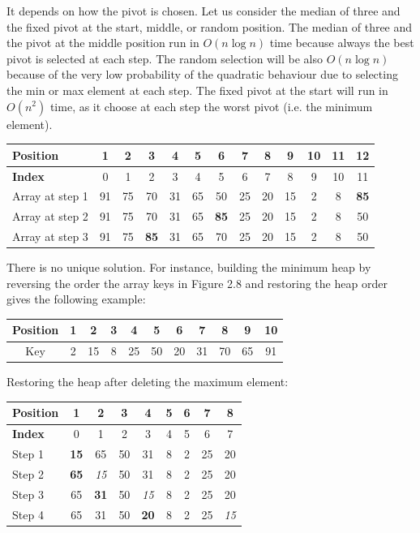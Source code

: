 It depends on how the pivot is chosen. Let us consider 
the median of three and the fixed pivot at the start, middle, or random
position. The median of three and the pivot at the middle position
run in \(O(n\log{n})\) time because always the best pivot is selected
at each step. The random selection will be also \(O(n\log n)\) because
of the very low probability of the quadratic behaviour due to selecting
the min or max element at each step. 
The fixed pivot at the start will run in \(O(n^2)\) time, as it choose 
at each step the 
worst pivot (i.e. the minimum element). 
\fi

\begin{center}
\begin{tabular}{|l|c|c|c|c|c|c|c|c|c|c|c|c|}
\hline
\textbf{Position}& 1& 2& 3& 4& 5& 6& 7& 8& 9& 10& 11& 12 \\
\hline
\textbf{Index}& 0& 1& 2& 3& 4& 5& 6& 7& 8& 9& 10& 11 \\
\hline
Array at step 1& 91& 75& 70& 31& 65& 50& 25& 20& 15& 2& 8& \textbf{85} \\
\hline
Array at step 2& 91& 75& 70& 31& 65& \textbf{85}& 25& 20& 15& 2& 8& 50 \\
\hline
Array at step 3& 91& 75& \textbf{85}& 31& 65& 70& 25& 20& 15& 2& 8& 50 \\
\hline
\end{tabular}
\end{center}

There is no unique solution. For instance,
building the minimum heap by reversing the order the array keys in Figure 2.8 
and restoring the heap order gives the 
following example:
\begin{center}
\begin{tabular}{|c|c|c|c|c|c|c|c|c|c|c|}
\hline
Position& 1& 2& 3& 4& 5& 6& 7& 8& 9& 10 \\
\hline
Key& 2& 15& 8& 25& 50& 20& 31& 70& 65& 91 \\
\hline
\end{tabular}
\end{center}
\fi

Restoring the heap after deleting the maximum element:
\begin{center}{\footnotesize
\begin{tabular}{|l|c|c|c|c|c|c|c|c|}
\hline
\textbf{Position}& 1& 2& 3& 4& 5& 6& 7& 8 \\
\hline
\textbf{Index}& 0& 1& 2& 3& 4& 5& 6& 7 \\
\hline
Step 1& \textbf{15}& 65 & 50& 31& 8& 2& 25& 20 \\
\hline
Step 2& \textbf{65}& \textit{15}& 50& 31& 8& 2& 25& 20 \\
\hline
Step 3& 65& \textbf{31}& 50& \textit{15}& 8& 2& 25& 20 \\
\hline
Step 4& 65& 31& 50& \textbf{20}& 8& 2& 25& \textit{15} \\
\hline
\end{tabular}
}
\end{center}

